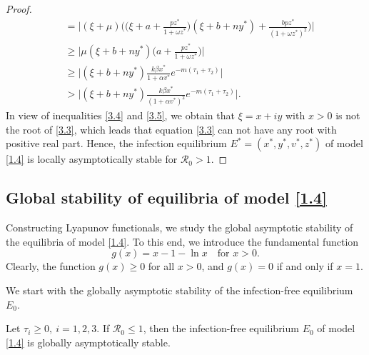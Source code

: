 \documentclass[reqno]{amsart}
\begin{document}
\begin{proof}
\begin{equation}
\begin{aligned}
&= \Big|(\xi+\mu)\Big(\Big(\xi+a+{\frac{pz^{*}}{1+\omega z^{*}}}\Big)
 (\xi+b+ny^{*})+{\frac{bpz^{*}}{(1+\omega z^{*})^{2}}}\Big)\Big|  \\
&\geqslant \Big|\mu(\xi+b+ny^{*})\Big(a+\frac{pz^*}{1+\omega z^*}\Big)\Big|    \\
&\geqslant \Big|(\xi+b+ny^{*})\frac{k\beta x^{*}}{1+\alpha v^{*}}
 e^{-m(\tau_1+\tau_2)}\Big|     \\
&> \Big|(\xi+b+ny^{*})\frac{k\beta x^{*}}{(1+\alpha v^{*})^{2}}
 e^{-m(\tau_1+\tau_2)}\Big|.
\end{aligned}
\end{equation}
In view of inequalities \eqref{3.4} and \eqref{3.5}, we obtain that $\xi=x+iy$ with $x>0$
is not the root of \eqref{3.3}, which leads that
equation \eqref{3.3} can not have any root with positive real part.
Hence, the  infection equilibrium $E^{*}=(x^{*},y^{*},v^{*},z^{*})$ of model \eqref{1.4}
is locally asymptotically stable for $\mathcal{R}_0>1$.
\end{proof}


\subsection{Global stability of equilibria of model \eqref{1.4}}

Constructing Lyapunov functionals, we study the global asymptotic stability of 
the  equilibria of model \eqref{1.4}.
To this end,  we introduce the fundamental function
$$
g(x)=x-1-\ln x \quad \text{for }  x>0.
$$
Clearly, the function $g(x) \geqslant$0 for all $x>0$, and $g(x)=0$ if and only 
if $x=1$.

We start with the globally  asymptotic stability of the infection-free  
equilibrium $E_0$.

\begin{theorem}\label{T3.3}
Let $\tau_{i}\geqslant0,\ i=1,2,3$.  If $\mathcal{R}_0\leq 1$, then the 
infection-free equilibrium  $E_0$ of model \eqref{1.4} is globally asymptotically stable.
\end{theorem}
\end{document}
